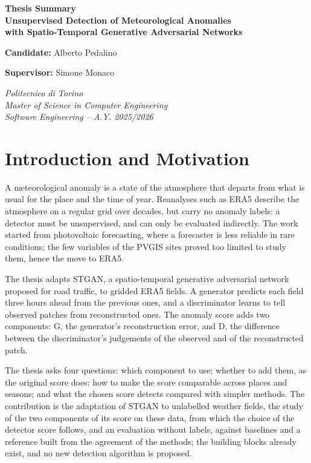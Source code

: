 \documentclass[11pt,a4paper]{article}
\begin{document}
\begin{center}
    {\Large\bfseries Thesis Summary\\[2pt]
    Unsupervised Detection of Meteorological Anomalies\\ with Spatio-Temporal Generative Adversarial Networks\par}
    \vspace{0.8em}
    {\large\textbf{Candidate:} Alberto Pedalino\par}
    \vspace{0.2em}
    {\large\textbf{Supervisor:} Simone Monaco\par}
    \vspace{0.2em}
    \textit{Politecnico di Torino}\\
    \textit{Master of Science in Computer Engineering}\\
    \textit{Software Engineering -- A.Y. 2025/2026}
\end{center}
\vspace{0.2em}

\section{Introduction and Motivation}

A meteorological anomaly is a state of the atmosphere that departs from what is usual for the place and the time of year. Reanalyses such as ERA5 describe the atmosphere on a regular grid over decades, but carry no anomaly labels: a detector must be unsupervised, and can only be evaluated indirectly. The work started from photovoltaic forecasting, where a forecaster is less reliable in rare conditions; the few variables of the PVGIS sites proved too limited to study them, hence the move to ERA5.

The thesis adapts STGAN, a spatio-temporal generative adversarial network proposed for road traffic, to gridded ERA5 fields. A generator predicts each field three hours ahead from the previous ones, and a discriminator learns to tell observed patches from reconstructed ones. The anomaly score adds two components: G, the generator's reconstruction error, and D, the difference between the discriminator's judgements of the observed and of the reconstructed patch.

The thesis asks four questions: which component to use; whether to add them, as the original score does; how to make the score comparable across places and seasons; and what the chosen score detects compared with simpler methods. The contribution is the adaptation of STGAN to unlabelled weather fields, the study of the two components of its score on these data, from which the choice of the detector score follows, and an evaluation without labels, against baselines and a reference built from the agreement of the methods; the building blocks already exist, and no new detection algorithm is proposed.
\end{document}
